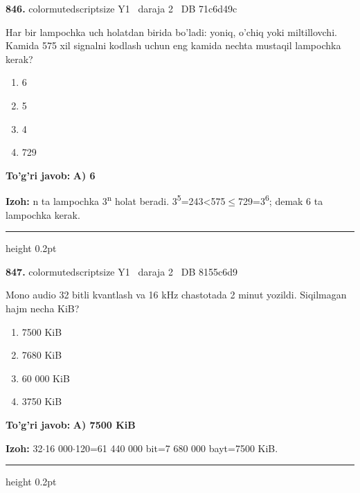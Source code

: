 \documentclass[10pt,a4paper,oneside]{article}
\begin{document}
\noindent\textbf{\color{ink}846.}  {color{muted}scriptsize Y1 \textbullet\ daraja 2 \textbullet\ DB 71c6d49c}
\par
Har bir lampochka uch holatdan birida bo'ladi: yoniq, o'chiq yoki miltillovchi. Kamida 575 xil signalni kodlash uchun eng kamida nechta mustaqil lampochka kerak?
\begin{enumerate}[label=\Alph*),leftmargin=9mm]
\item 6
\item 5
\item 4
\item 729
\end{enumerate}
\begin{tcolorbox}[enhanced,breakable,colback=teal!4,colframe=teal!50!black,boxrule=0.5pt,arc=1.1mm,left=3mm,right=3mm,top=1.7mm,bottom=1.7mm,before skip=2mm,after skip=2mm]
\textbf{\color{teal}To'g'ri javob:} \textbf{A) 6}
\par\smallskip
\textbf{Izoh:} n ta lampochka 3\textsuperscript{n} holat beradi. 3\textsuperscript{5}=243\textless{}575\ensuremath{\leq}729=3\textsuperscript{6}; demak 6 ta lampochka kerak.
\end{tcolorbox}
\vspace{2mm}\hrule height 0.2pt \vspace{3mm}

\noindent\textbf{\color{ink}847.}  {color{muted}scriptsize Y1 \textbullet\ daraja 2 \textbullet\ DB 8155c6d9}
\par
Mono audio 32 bitli kvantlash va 16 kHz chastotada 2 minut yozildi. Siqilmagan hajm necha KiB?
\begin{enumerate}[label=\Alph*),leftmargin=9mm]
\item 7500 KiB
\item 7680 KiB
\item 60 000 KiB
\item 3750 KiB
\end{enumerate}
\begin{tcolorbox}[enhanced,breakable,colback=teal!4,colframe=teal!50!black,boxrule=0.5pt,arc=1.1mm,left=3mm,right=3mm,top=1.7mm,bottom=1.7mm,before skip=2mm,after skip=2mm]
\textbf{\color{teal}To'g'ri javob:} \textbf{A) 7500 KiB}
\par\smallskip
\textbf{Izoh:} 32\ensuremath{\cdot}16 000\ensuremath{\cdot}120=61 440 000 bit=7 680 000 bayt=7500 KiB.
\end{tcolorbox}
\vspace{2mm}\hrule height 0.2pt \vspace{3mm}
\end{document}
